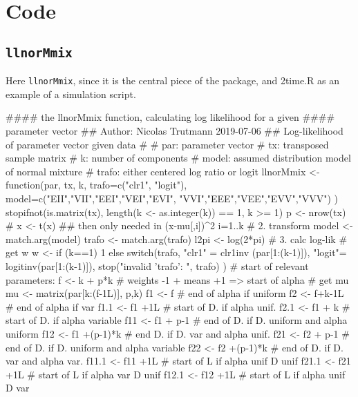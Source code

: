 \chapter{\Rp Code}


\section{{\tt llnorMmix}}

Here {\tt llnorMmix}, since it is the central piece of the package,
and 2time.R as an example of a simulation script.


\begin{Schunk}
\begin{Soutput}
#### the llnorMmix function, calculating log likelihood for a given
#### parameter vector
## Author: Nicolas Trutmann 2019-07-06
## Log-likelihood of parameter vector given data
#
# par:   parameter vector
# tx:    transposed sample matrix
# k:     number of components
# model: assumed distribution model of normal mixture
# trafo: either centered log ratio or logit
llnorMmix <- function(par, tx, k,
                      trafo=c("clr1", "logit"),
                      model=c("EII","VII","EEI","VEI","EVI",
                              "VVI","EEE","VEE","EVV","VVV")
                      ) {
    stopifnot(is.matrix(tx),
              length(k <- as.integer(k)) == 1, k >= 1)
    p <- nrow(tx)
#    x <- t(x) ## then only needed in   (x-mu[,i])^2  i=1..k
    # 2. transform
    model <- match.arg(model)
    trafo <- match.arg(trafo)
    l2pi <- log(2*pi)
    # 3. calc log-lik
    # get w
    w <- if (k==1) 1
         else switch(trafo,
                     "clr1" = clr1inv (par[1:(k-1)]),
                     "logit"= logitinv(par[1:(k-1)]),
                     stop("invalid 'trafo': ", trafo)
         )
    # start of relevant parameters:
    f <- k + p*k # weights -1 + means +1 => start of alpha
    # get mu
    mu <- matrix(par[k:(f-1L)], p,k)
    f1 <- f      # end of alpha if uniform
    f2 <- f+k-1L # end of alpha if var
    f1.1 <- f1 +1L # start of D. if alpha unif.
    f2.1 <- f1 + k # start of D. if alpha variable
    f11 <- f1 + p-1    # end of D. if D. uniform and alpha uniform
    f12 <- f1 +(p-1)*k # end    D. if D.   var   and alpha unif.
    f21 <- f2 + p-1    # end of D. if D. uniform and alpha variable
    f22 <- f2 +(p-1)*k # end of D. if D.   var   and alpha var.
    f11.1 <- f11 +1L # start of L if alpha unif  D unif
    f21.1 <- f21 +1L # start of L if alpha var   D unif
    f12.1 <- f12 +1L # start of L if alpha unif  D var
}
\end{Soutput}
\end{Schunk}
